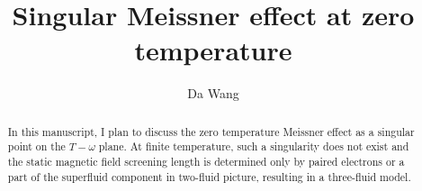 \documentclass[manuscript]{revtex4-1}
\begin{document}
	
\title{Singular Meissner effect at zero temperature}
\author{Da Wang}

\begin{abstract}
In this manuscript, I plan to discuss the zero temperature Meissner effect as a singular point on the $T-\omega$ plane.
At finite temperature, such a singularity does not exist and the static magnetic field screening length is determined
only by paired electrons or a part of the superfluid component in two-fluid picture, resulting in a three-fluid model. 
\end{abstract}
\maketitle



\end{document}
